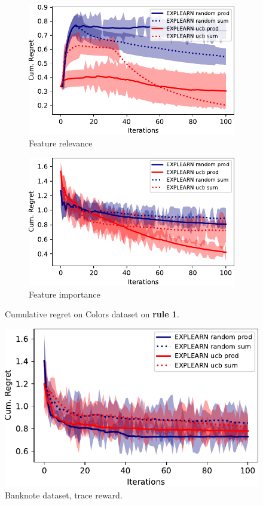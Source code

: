 \documentclass[letterpaper]{article} %
\newcommand{\colors}{{\sf Colors}\xspace}
\newcommand{\banknote}{{\sf Banknote}\xspace}
\begin{document}
\begin{figure}[tb]
\centering
    \begin{subfigure}{.23\textwidth}
      \centering
      \includegraphics[width=\textwidth]{images/colors-1-relevance.pdf}
      \caption{Feature relevance}
      \label{fig:colors-1-rel}
    \end{subfigure}
    \begin{subfigure}{.23\textwidth}
      \centering
      \includegraphics[width=\textwidth]{images/colors-1-polarity.pdf}
      \caption{Feature importance}
      \label{fig:colors-1-pol}
    \end{subfigure}
    \caption{Cumulative regret on \colors dataset on \textbf{rule 1}.}
    \label{fig:colors-1}
\end{figure}


\begin{figure}[tb]
  \centering
  \includegraphics[width=.6\columnwidth]{images/banknote.pdf}
  \caption{\banknote dataset, trace reward.}
  \label{fig:banknote}
\end{figure}
\end{document}
